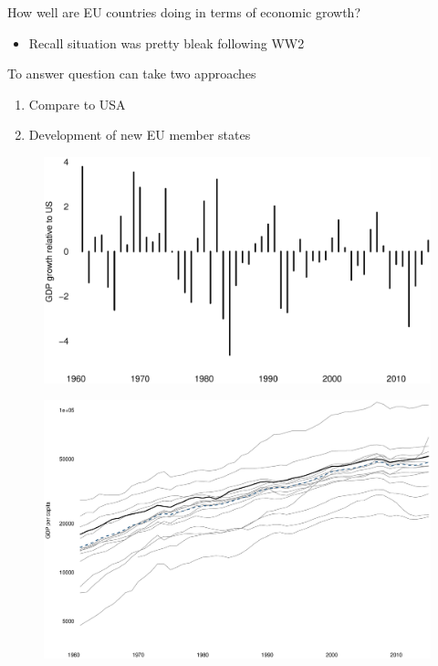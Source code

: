 \documentclass{beamer}
\begin{document}
\begin{frame}
  How well are EU countries doing in terms of economic growth?
  \begin{itemize}
    \item Recall situation was pretty bleak following WW2
  \end{itemize}
  \medskip
  To answer question can take two approaches  
\begin{enumerate}
  \item Compare to USA
  \item Development of new EU member states
\end{enumerate}
\end{frame}

\begin{frame}
  \begin{figure}
    \includegraphics[scale=.3]{versus_us.eps}
  \end{figure}
\end{frame}

\begin{frame}
  \begin{figure}
    \includegraphics[scale=.3]{versus_us2.eps}
  \end{figure}
\end{frame}
\end{document}
